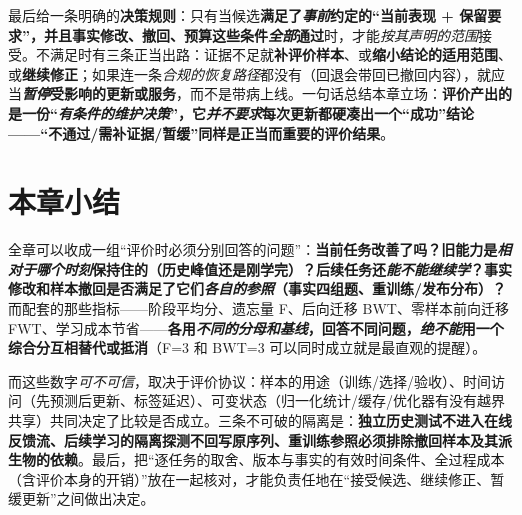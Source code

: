 最后给一条明确的\textbf{决策规则}：只有当候选\textbf{满足了\emph{事前}约定的“当前表现 + 保留要求”，并且事实修改、撤回、预算这些条件\emph{全部}通过}时，才能\emph{按其声明的范围}接受。不满足时有三条正当出路：证据不足就\textbf{补评价样本}、或\textbf{缩小结论的适用范围}、或\textbf{继续修正}；如果连一条\emph{合规的恢复路径}都没有（回退会带回已撤回内容），就应当\textbf{\emph{暂停}受影响的更新或服务}，而不是带病上线。一句话总结本章立场：\textbf{评价产出的是一份“\emph{有条件的维护决策}”，它\emph{并不要求}每次更新都硬凑出一个“成功”结论——“不通过/需补证据/暂缓”同样是正当而重要的评价结果}。

\section{本章小结}
\label{sec:ket-evolution-evaluation-summary}

全章可以收成一组“评价时必须分别回答的问题”：\textbf{当前任务改善了吗？旧能力是\emph{相对于\emph{哪个时刻}}保持住的（历史峰值还是刚学完）？后续任务还\emph{能不能继续学}？事实修改和样本撤回是否满足了它们\emph{各自的参照}（事实四组题、重训练/发布分布）？}而配套的那些指标——阶段平均分、遗忘量 F、后向迁移 BWT、零样本前向迁移 FWT、学习成本节省——\textbf{各用\emph{不同的分母和基线}，回答不同问题，\emph{绝不能}用一个综合分互相替代或抵消}（F=3 和 BWT=3 可以同时成立就是最直观的提醒）。

而这些数字\emph{可不可信}，取决于评价协议：样本的用途（训练/选择/验收）、时间访问（先预测后更新、标签延迟）、可变状态（归一化统计/缓存/优化器有没有越界共享）共同决定了比较是否成立。三条不可破的隔离是：\textbf{独立历史测试不进入在线反馈流、后续学习的隔离探测不回写原序列、重训练参照必须排除撤回样本及其派生物的依赖}。最后，把“逐任务的取舍、版本与事实的有效时间条件、全过程成本（含评价本身的开销）”放在一起核对，才能负责任地在“接受候选、继续修正、暂缓更新”之间做出决定。
